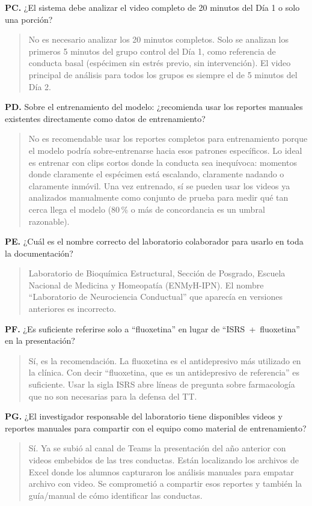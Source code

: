 \textbf{PC.} ¿El sistema debe analizar el video completo de 20 minutos del Día 1 o
solo una porción?

\begin{quote}
No es necesario analizar los 20 minutos completos. Solo se analizan los primeros
5 minutos del grupo control del Día 1, como referencia de conducta basal (espécimen
sin estrés previo, sin intervención). El video principal de análisis para todos los
grupos es siempre el de 5 minutos del Día 2.
\end{quote}

\textbf{PD.} Sobre el entrenamiento del modelo: ¿recomienda usar los reportes manuales
existentes directamente como datos de entrenamiento?

\begin{quote}
No es recomendable usar los reportes completos para entrenamiento porque el modelo
podría sobre-entrenarse hacia esos patrones específicos. Lo ideal es entrenar con clips
cortos donde la conducta sea inequívoca: momentos donde claramente el espécimen está
escalando, claramente nadando o claramente inmóvil. Una vez entrenado, sí se pueden
usar los videos ya analizados manualmente como conjunto de prueba para medir qué tan
cerca llega el modelo (80\,\% o más de concordancia es un umbral razonable).
\end{quote}

\textbf{PE.} ¿Cuál es el nombre correcto del laboratorio colaborador para usarlo en
toda la documentación?

\begin{quote}
Laboratorio de Bioquímica Estructural, Sección de Posgrado, Escuela Nacional de
Medicina y Homeopatía (ENMyH-IPN). El nombre ``Laboratorio de Neurociencia
Conductual'' que aparecía en versiones anteriores es incorrecto.
\end{quote}

\textbf{PF.} ¿Es suficiente referirse solo a ``fluoxetina'' en lugar de
``ISRS~+~fluoxetina'' en la presentación?

\begin{quote}
Sí, es la recomendación. La fluoxetina es el antidepresivo más utilizado en la
clínica. Con decir ``fluoxetina, que es un antidepresivo de referencia'' es suficiente.
Usar la sigla ISRS abre líneas de pregunta sobre farmacología que no son necesarias
para la defensa del TT.
\end{quote}

\textbf{PG.} ¿El investigador responsable del laboratorio tiene disponibles videos y reportes manuales para
compartir con el equipo como material de entrenamiento?

\begin{quote}
Sí. Ya se subió al canal de Teams la presentación del año anterior con videos
embebidos de las tres conductas. Están localizando los archivos de Excel donde los
alumnos capturaron los análisis manuales para empatar archivo con video. Se comprometió
a compartir esos reportes y también la guía/manual de cómo identificar las conductas.
\end{quote}
